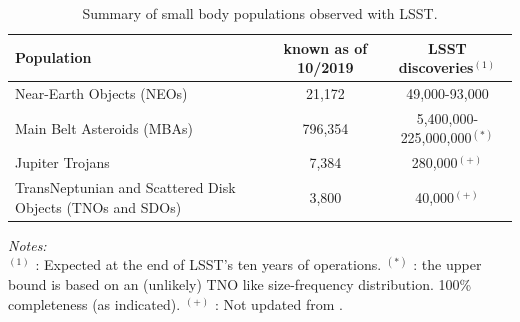 \begin{table}[tb!]
\begin{center}
\caption{Summary of small body populations observed with LSST.}
\label{tab:table1}
 {\scriptsize
  \begin{tabular}{|l|c|c|}\hline\hline
Population & known as of 10/2019 &  LSST discoveries$^{(1)}$ \\ \hline
Near-Earth Objects (NEOs) & 21,172 & 49,000-93,000  \\\hline
Main Belt Asteroids (MBAs) & 796,354 & 5,400,000-225,000,000$^{(*)}$  \\ \hline
Jupiter Trojans & 7,384 & 280,000$^{(+)}$\\ \hline
TransNeptunian and Scattered Disk Objects (TNOs and SDOs) & 3,800 & 40,000$^{(+)}$ \\ \hline\hline
 \end{tabular}
  }
 \end{center}
\vspace{1mm}
 \scriptsize{
 {\it Notes:}\\
  $^{(1)}$ : Expected at the end of LSST's ten years of operations.
  $^{(*)}$ : the upper bound is based on an (unlikely) TNO like size-frequency distribution.
  100\% completeness (as indicated).
  $^{(+)}$ : Not updated from \citep{jones2015asteroid}.}
\end{table}



